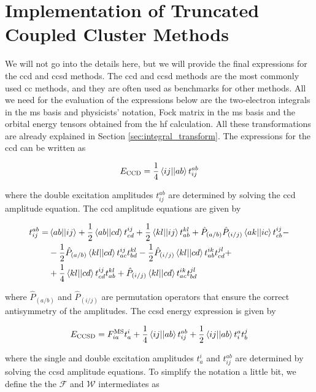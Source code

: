 \section{Implementation of Truncated Coupled Cluster Methods}

We will not go into the details here, but we will provide the final expressions for the \acrshort{ccd} and \acrshort{ccsd} methods.\cite{10.1063/1.460620} The \acrshort{ccd} and \acrshort{ccsd} methods are the most commonly used \acrshort{cc} methods, and they are often used as benchmarks for other methods. All we need for the evaluation of the expressions below are the two-electron integrals in the \acrshort{ms} basis and physicists' notation, Fock matrix in the \acrshort{ms} basis and the orbital energy tensors obtained from the \acrshort{hf} calculation. All these transformations are already explained in Section \ref{sec:integral_transform}. The expressions for the \acrshort{ccd} can be written as

\begin{equation}
E_{\text{CCD}}=\frac{1}{4}\braket{ij||ab}t_{ij}^{ab}
\end{equation}

where the double excitation amplitudes \(t_{ij}^{ab}\) are determined by solving the \acrshort{ccd} amplitude equation. The \acrshort{ccd} amplitude equations are given by

\begin{align}
t_{ij}^{ab}=&\braket{ab||ij}+\frac{1}{2}\braket{ab||cd}t_{cd}^{ij}+\frac{1}{2}\braket{kl||ij}t_{ab}^{kl}+\hat{P}_{(a/b)}\hat{P}_{(i/j)}\braket{ak||ic}t_{cb}^{ij}-\nonumber \\
&-\frac{1}{2}\hat{P}_{(a/b)}\braket{kl||cd}t_{ac}^{ij}t_{bd}^{kl}-\frac{1}{2}\hat{P}_{(i/j)}\braket{kl||cd}t_{ab}^{ik}t_{cd}^{jl}+\nonumber \\
&+\frac{1}{4}\braket{kl||cd}t_{cd}^{ij}t_{ab}^{kl}+\hat{P}_{(i/j)}\braket{kl||cd}t_{ac}^{ik}t_{bd}^{jl}
\end{align}

where \(\hat{P}_{(a/b)}\) and \(\hat{P}_{(i/j)}\) are permutation operators that ensure the correct antisymmetry of the amplitudes. The \acrshort{ccsd} energy expression is given by

\begin{equation}
E_{\text{CCSD}}=F_{ia}^{\mathrm{MS}}t_a^i+\frac{1}{4}\braket{ij||ab}t_{ij}^{ab}+\frac{1}{2}\braket{ij||ab}t_{i}^{a}t_{b}^{j}
\end{equation}

where the single and double excitation amplitudes \(t_a^i\) and \(t_{ij}^{ab}\) are determined by solving the \acrshort{ccsd} amplitude equations. To simplify the notation a little bit, we define the the \(\mathscr{F}\) and \(\mathscr{W}\) intermediates as

